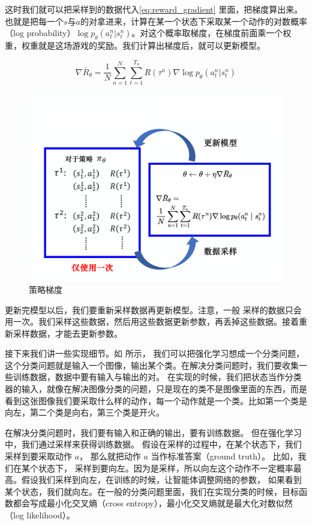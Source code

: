 这时我们就可以把采样到的数据代入\eqref{eq:reward_gradient} 里面，把梯度算出来。也就是把每一个$s$与$a$的对拿进来，计算在某一个状态下采取某一个动作的对数概率（log probability）$\log p_{\theta}\left(a_{t}^{n} | s_{t}^{n}\right)$。对这个概率取梯度，在梯度前面乘一个权重，权重就是这场游戏的奖励。我们计算出梯度后，就可以更新模型。

\begin{equation}
    \label{eq:reward_gradient}
    \nabla \bar{R}_{\theta}=\frac{1}{N} \sum_{n=1}^{N} \sum_{t=1}^{T_{n}} R\left(\tau^{n}\right) \nabla \log p_{\theta}\left(a_{t}^{n} | s_{t}^{n}\right)
\end{equation}

\begin{figure}[hbt]
    \centering
    \includegraphics[width=0.5\linewidth]{res/ch4/4.8}
    \caption{策略梯度}
    \label{fig:fig4.8}
\end{figure}

更新完模型以后，我们要重新采样数据再更新模型。注意，一般 采样的数据只会用一次。我们采样这些数据，然后用这些数据更新参数，再丢掉这些数据。接着重新采样数据，才能去更新参数。

接下来我们讲一些实现细节。如 所示，
我们可以把强化学习想成一个分类问题，这个分类问题就是输入一个图像，输出某个类。在解决分类问题时，我们要收集一些训练数据，数据中要有输入与输出的对。
在实现的时候，我们把状态当作分类器的输入，就像在解决图像分类的问题，只是现在的类不是图像里面的东西，而是看到这张图像我们要采取什么样的动作，每一个动作就是一个类。比如第一个类是向左，第二个类是向右，第三个类是开火。

在解决分类问题时，我们要有输入和正确的输出，要有训练数据。
但在强化学习中，我们通过采样来获得训练数据。
假设在采样的过程中，在某个状态下，我们采样到要采取动作 $a$， 那么就把动作 $a$ 当作标准答案（ground truth）。
比如，我们在某个状态下，
采样到要向左。因为是采样，所以向左这个动作不一定概率最高。假设我们采样到向左，在训练的时候，让智能体调整网络的参数， 如果看到某个状态，我们就向左。在一般的分类问题里面，我们在实现分类的时候，目标函数都会写成最小化交叉熵（cross entropy），最小化交叉熵就是最大化对数似然（log likelihood）。

